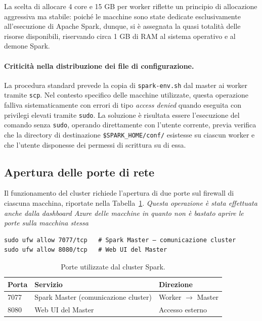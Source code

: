\documentclass[../main.tex]{subfiles}
\begin{document}
La scelta di allocare 4 core e 15 GB per worker riflette un principio di allocazione aggressiva ma stabile: poiché le macchine sono state dedicate esclusivamente all'esecuzione di Apache Spark, dunque, si è assegnata la quasi totalità delle risorse disponibili, riservando circa 1 GB di RAM al sistema operativo e al demone Spark.

\paragraph{Criticità nella distribuzione dei file di configurazione.} La procedura standard prevede la copia di \texttt{spark-env.sh} dal master ai worker tramite \texttt{scp}. Nel contesto specifico delle macchine utilizzate, questa operazione falliva sistematicamente con errori di tipo \textit{access denied} quando eseguita con privilegi elevati tramite \texttt{sudo}. La soluzione è risultata essere l'esecuzione del comando senza \texttt{sudo}, operando direttamente con l'utente corrente, previa verifica che la directory di destinazione \texttt{\$SPARK\_HOME/conf/} esistesse su ciascun worker e che l'utente disponesse dei permessi di scrittura su di essa.

\subsection{Apertura delle porte di rete}


Il funzionamento del cluster richiede l'apertura di due porte sul firewall di ciascuna macchina, riportate nella Tabella~\ref{tab:porte_spark}.
\textit{Questa operazione è stata effettuata anche dalla dashboard Azure delle macchine in quanto non è bastato aprire le porte sulla macchina stessa}

\begin{listing}[H]
\begin{verbatim}
sudo ufw allow 7077/tcp   # Spark Master — comunicazione cluster
sudo ufw allow 8080/tcp   # Web UI del Master
\end{verbatim}
\caption{Apertura delle porte necessarie al funzionamento del cluster Spark.}
\label{lst:ufw}
\end{listing}



\begin{table}[H]
\centering
\begin{tabular}{lll}
\toprule
\textbf{Porta} & \textbf{Servizio} & \textbf{Direzione} \\
\midrule
7077 & Spark Master (comunicazione cluster) & Worker $\rightarrow$ Master \\
8080 & Web UI del Master                    & Accesso esterno \\
\bottomrule
\end{tabular}
\caption{Porte utilizzate dal cluster Spark.}
\label{tab:porte_spark}
\end{table}
\end{document}
